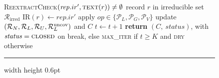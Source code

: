 \begin{figure}[H]
\begin{algorithmic}[1]
{        \hspace*{4em}\textsc{ReextractCheck}$(\mathit{rep}.ir',\textsc{text}(r))\neq\emptyset$}
        \State record $r$ in irreducible set $\mathcal{R}_{\mathrm{irred}}$
        \Statex {}
        \State $\mathrm{IR}(r)\gets \mathit{rep}.ir'$ 
      \EndIf
    \EndFor
  \Else
    \State apply $\mathit{op}\in\{\mathcal{P}_L,\mathcal{P}_G,\mathcal{P}_V\}$
  \EndIf
  \State update $(\mathcal{R}_N,\mathcal{R}_L,\mathcal{R}_U,\mathcal{R}_L^{\mathrm{uncov}})$ and $C$
  \State $t\gets t+1$
\State \textbf{return} $(C,\ \mathit{status})$, with $\mathit{status}=\textsc{closed}$
  on break, else \textsc{max\_iter} if $t\ge K$ and \textsc{dry} otherwise
\end{algorithmic}
\vspace{1pt}
\hrule width \linewidth height 0.6pt\relax
\end{figure}

